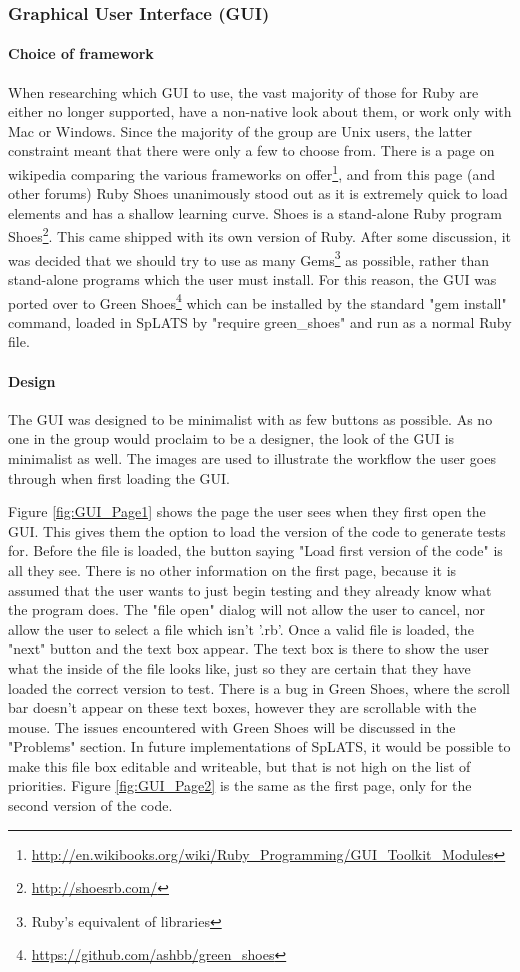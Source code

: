   \subsubsection{Graphical User Interface (GUI)}
  \paragraph{Choice of framework}
  When researching which GUI to use, the vast majority of those for Ruby are either no longer supported, have a non-native look about them, or work only with Mac or Windows. Since the majority of the group are Unix users, the latter constraint meant that there were only a few to choose from. There is a page on wikipedia comparing the various frameworks on offer\footnote{\url{http://en.wikibooks.org/wiki/Ruby_Programming/GUI_Toolkit_Modules}}, and from this page (and other forums) Ruby Shoes unanimously stood out as it is extremely quick to load elements and has a shallow learning curve.
  Shoes is a stand-alone Ruby program Shoes\footnote{\url{http://shoesrb.com/}}. This came shipped with its own version of Ruby. After some discussion, it was decided that we should try to use as many Gems\footnote{Ruby's equivalent of libraries} as possible, rather than stand-alone programs which the user must install. For this reason, the GUI was ported over to Green Shoes\footnote{\url{https://github.com/ashbb/green_shoes}} which can be installed by the standard "gem install" command, loaded in SpLATS by "require green\_shoes" and run as a normal Ruby file.
  
  \paragraph{Design}
  The GUI was designed to be minimalist with as few buttons as possible. As no one in the group would proclaim to be a designer, the look of the GUI is minimalist as well. The images are used to illustrate the workflow the user goes through when first loading the GUI.
  
  Figure \ref{fig:GUI_Page1} shows the page the user sees when they first open the GUI. This gives them the option to load the version of the code to generate tests for. Before the file is loaded, the button saying "Load first version of the code" is all they see. There is no other information on the first page, because it is assumed that the user wants to just begin testing and they already know what the program does. The "file open" dialog will not allow the user to cancel, nor allow the user to select a file which isn't '.rb'. Once a valid file is loaded, the "next" button and the text box appear. The text box is there to show the user what the inside of the file looks like, just so they are certain that they have loaded the correct version to test. There is a bug in Green Shoes, where the scroll bar doesn't appear on these text boxes, however they are scrollable with the mouse. The issues encountered with Green Shoes will be discussed in the "Problems" section. In future implementations of SpLATS, it would be possible to make this file box editable and writeable, but that is not high on the list of priorities.
Figure \ref{fig:GUI_Page2} is the same as the first page, only for the second version of the code.
  
